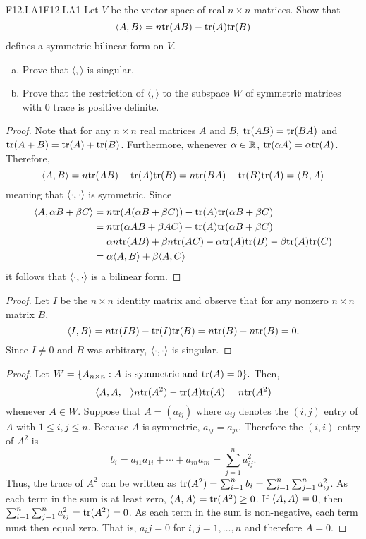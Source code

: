 \documentclass[../AlgebraQualSolutions.tex]{subfiles}
\begin{document}
\begin{prob}{F12.LA1}{F12.LA1}
    Let $V$ be the vector space of real $n \times n$ matrices. Show that 	
        \[\langle A, B \rangle = n \mathrm{tr}(AB) - \mathrm{tr}(A)\mathrm{tr}(B) \]
    defines a symmetric bilinear form on $V$.
    \begin{enumerate}[(a)]
    \item Prove that $\langle,\rangle$ is singular.
    \item Prove that the restriction of $\langle,\rangle$ to the subspace $W$ of symmetric matrices with 0 trace is positive definite.
    \end{enumerate}
    \end{prob}
    
    \begin{proof}
        Note that for any $n \times n$ real matrices $A$ and $B$, $\mathrm{tr}(AB) = \mathrm{tr}(BA)$ and $\mathrm{tr}(A+B) = \mathrm{tr}(A) + \mathrm{tr}(B)$. Furthermore, whenever $\alpha \in \mathbb{R}$, $\mathrm{tr}(\alpha A) = \alpha \mathrm{tr}(A)$. Therefore,
            \[\langle A, B\rangle = n \mathrm{tr}(AB) - \mathrm{tr}(A)\mathrm{tr}(B) = n \mathrm{tr}(BA) - \mathrm{tr}(B)\mathrm{tr}(A) = \langle B, A\rangle\]
        meaning that $\langle \cdot, \cdot\rangle$ is symmetric. Since
            \begin{align*}
                \langle A, \alpha B + \beta C\rangle &= n\mathrm{tr}(A(\alpha B + \beta C)) - \mathrm{tr}(A) \mathrm{tr}(\alpha B + \beta C)\\
                &= n\mathrm{tr}(\alpha AB + \beta AC) - \mathrm{tr}(A) \mathrm{tr}(\alpha B + \beta C)\\
                &= \alpha n \mathrm{tr}(AB) + \beta n \mathrm{tr}(AC) - \alpha \mathrm{tr}(A)\mathrm{tr}(B) - \beta \mathrm{tr}(A)\mathrm{tr}(C)\\
                &= \alpha \langle A, B\rangle + \beta\langle A, C\rangle
            \end{align*}
        it follows that $\langle \cdot, \cdot\rangle$ is a bilinear form.
    \end{proof}
    
    \begin{proof}
        Let $I$ be the $n \times n$ identity matrix and observe that for any nonzero $n \times n$ matrix $B$,
            \[\langle I, B\rangle = n\mathrm{tr}(IB) - \mathrm{tr}(I)\mathrm{tr}(B) = n\mathrm{tr}(B) - n \mathrm{tr}(B) = 0.\]
        Since $I \neq 0$ and $B$ was arbitrary, $\langle \cdot, \cdot\rangle$ is singular.
    \end{proof}
    
    \begin{proof}
        Let $W = \{A_{n\times n}: A \textrm{ is symmetric  and } \mathrm{tr}(A) = 0\}.$ Then,
            \[\langle A,A, =\rangle n\mathrm{tr}(A^2) - \mathrm{tr}(A)\mathrm{tr}(A) = n\mathrm{tr}(A^2)\]
        whenever $A \in W$. Suppose that $A = (a_{ij})$ where $a_{ij}$ denotes the $(i,j)$ entry of $A$ with $1\leq i,j \leq n$. Because $A$ is symmetric, $a_{ij} = a_{ji}$. Therefore the $(i,i)$ entry of $A^2$ is
            \[b_i = a_{i1}a_{1i} + \cdots + a_{in}a_{ni} = \sum_{j=1}^n a_{ij}^2. \]
        Thus, the trace of $A^2$ can be written as $\mathrm{tr}(A^2) = \sum_{i=1}^n b_i = \sum_{i=1}^n \sum_{j=1}^n a_{ij}^2$. As each term in the sum is at least zero, $\langle A, A\rangle = \mathrm{tr}(A^2) \geq 0$. If $\langle A, A\rangle = 0$, then $\sum_{i=1}^n \sum_{j=1}^n a_{ij}^2 = \mathrm{tr}(A^2) = 0$. As each term in the sum is non-negative, each term must then equal zero. That is, $a_ij = 0$ for $i,j = 1, \ldots, n$ and therefore $A = 0$.
    \end{proof}
    
\end{document}
